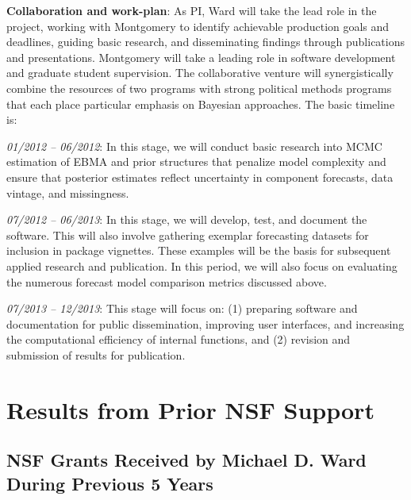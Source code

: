 \documentclass[pdftex,12pt,fullpage,oneside]{amsart}
\begin{document}
\textbf{Collaboration and work-plan}: As PI, Ward will take the lead
role in the project, working with Montgomery to identify achievable
production goals and deadlines, guiding basic research, and
disseminating findings through publications and presentations.
Montgomery will take a leading role in software development and
graduate student supervision. The collaborative venture
will synergistically combine the resources of two programs with strong
political methods programs that each place particular emphasis on Bayesian
approaches.  The basic timeline is:




\noindent \textit{01/2012 -- 06/2012}: In this stage, we will conduct
basic research into MCMC estimation of EBMA and prior structures that
penalize model complexity and ensure that posterior estimates reflect
uncertainty in component forecasts, data vintage, and missingness.

\noindent \textit{07/2012 -- 06/2013}: In this stage, we will develop,
test, and document the software. This will also involve gathering
exemplar forecasting datasets for inclusion in package vignettes.
These examples will be the basis for subsequent applied research and
publication.  In this period, we will also focus on evaluating the
numerous forecast model comparison metrics discussed above.

\noindent \textit{07/2013 -- 12/2013}: This stage will focus on: (1)
preparing software and documentation for public dissemination,
improving user interfaces, and increasing the computational efficiency
of internal functions, and (2) revision and submission of results for
publication.



\section{Results from Prior NSF Support}


\subsection{NSF Grants Received by Michael D. Ward During Previous 5 Years}
\end{document}
